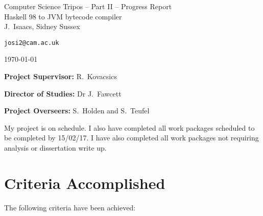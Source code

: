 \documentclass[12pt,a4paper,twoside]{article}
\begin{document}
\begin{center}
  \Large
  Computer Science Tripos -- Part II -- Progress Report\\[4mm]
  \LARGE
  Haskell 98 to JVM bytecode compiler\\[4mm]

  \large
  J.~Isaacs, Sidney Sussex

  \texttt{josi2@cam.ac.uk}

  \today
\end{center}

\vspace{5mm}

\textbf{Project Supervisor:} R.~Kovacsics

\textbf{Director of Studies:} Dr J.~Fawcett 

\textbf{Project Overseers:} S.~Holden and S.~Teufel


My project is on schedule. I also have completed all work packages scheduled to be completed by 15/02/17.
I have also completed all work packages not requiring analysis or dissertation write up.



 \section*{Criteria Accomplished}

  The following criteria have been achieved:
\end{document}
